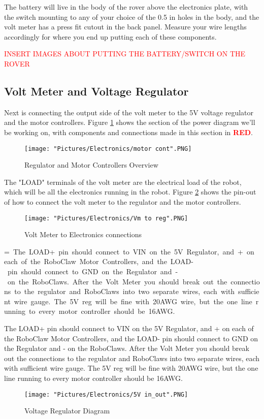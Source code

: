 \documentclass[12pt]{article}
\makeatletter
\newcommand{\mybox}[1]{%
  \setbox0=\hbox{#1}%
  \setlength{\@tempdima}{\dimexpr\wd0+13pt}%
  \begin{tcolorbox}[colframe=mycolor,boxrule=0.5pt,arc=4pt,
      left=6pt,right=6pt,top=6pt,bottom=6pt,boxsep=0pt,width=0.95\textwidth]
    #1
  \end{tcolorbox}
}
\makeatother
\begin{document}
The battery will live in the body of the rover above the electronics plate, with the switch mounting to any of your choice of the 0.5 in holes in the body, and the volt meter has a press fit cutout in the back panel. Measure your wire lengths accordingly for where you end up putting each of these components. 

\textcolor{red}{INSERT IMAGES ABOUT PUTTING THE BATTERY/SWITCH ON THE ROVER}

\subsection{Volt Meter and Voltage Regulator}
Next is connecting the output side of the volt meter to the 5V voltage regulator and the motor controllers. Figure \ref{motor cont} shows the section of the power diagram we'll be working on, with components and connections made in this section in \textcolor{red}{\textbf{RED}}.

\begin{figure}[H]
  	\centering
    	\texttt{[image: "Pictures/Electronics/motor cont".PNG]}
 	\caption{Regulator and Motor Controllers Overview}
	\label{motor cont}
\end{figure}


The "LOAD" terminals of the volt meter are the electrical load of the robot, which will be all the electronics running in the robot. Figure \ref{vm sch} shows the pin-out of how to connect the volt meter to the regulator and the motor controllers.

\begin{figure}[H]
  	\centering
    	\texttt{[image: "Pictures/Electronics/Vm to reg".PNG]}
 	\caption{Volt Meter to Electronics connections}
	\label{vm sch}
\end{figure}

\mybox{
\noindent  The LOAD+ pin should connect to VIN on the 5V Regulator, and + on each of the RoboClaw Motor Controllers, and the LOAD- pin should connect to GND on the Regulator and - on the RoboClaws. After the Volt Meter you should break out the connections to the regulator and RoboClaws into two separate wires, each with sufficient wire gauge. The 5V reg will be fine with 20AWG wire, but the one line running to every motor controller should be 16AWG.  
}

\begin{figure}[H]
  	\centering
    	\texttt{[image: "Pictures/Electronics/5V in\_out".PNG]}
 	\caption{Voltage Regulator Diagram}
	\label{regs}
\end{figure}
\end{document}
